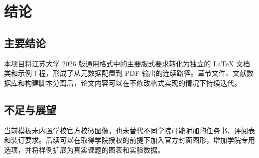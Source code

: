 \chapter{结论}

\section{主要结论}
本项目将江苏大学 2026 版通用格式中的主要版式要求转化为独立的 LaTeX 文档类和示例工程，形成了从元数据配置到 PDF 输出的连续路径。章节文件、文献数据库和构建脚本分离后，论文内容可以在不修改格式实现的情况下持续迭代。

\section{不足与展望}
当前模板未内置学校官方校徽图像，也未替代不同学院可能附加的任务书、评阅表和装订要求。后续可以在取得学院授权的前提下加入官方封面图形，增加学院专用选项，并将样例扩展为真实课题的图表和实验数据。
